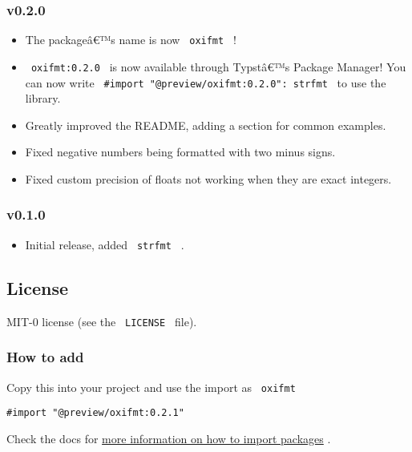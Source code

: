 \subsubsection{v0.2.0}\label{v0.2.0}

\begin{itemize}
\tightlist
\item
  The packageâ€™s name is now \texttt{\ oxifmt\ } !
\item
  \texttt{\ oxifmt:0.2.0\ } is now available through Typstâ€™s Package
  Manager! You can now write
  \texttt{\ \#import\ "@preview/oxifmt:0.2.0":\ strfmt\ } to use the
  library.
\item
  Greatly improved the README, adding a section for common examples.
\item
  Fixed negative numbers being formatted with two minus signs.
\item
  Fixed custom precision of floats not working when they are exact
  integers.
\end{itemize}

\subsubsection{v0.1.0}\label{v0.1.0}

\begin{itemize}
\tightlist
\item
  Initial release, added \texttt{\ strfmt\ } .
\end{itemize}

\subsection{License}\label{license}

MIT-0 license (see the \texttt{\ LICENSE\ } file).

\subsubsection{How to add}\label{how-to-add}

Copy this into your project and use the import as \texttt{\ oxifmt\ }

\begin{verbatim}
#import "@preview/oxifmt:0.2.1"
\end{verbatim}



Check the docs for
\href{https://typst.app/docs/reference/scripting/\#packages}{more
information on how to import packages} .

